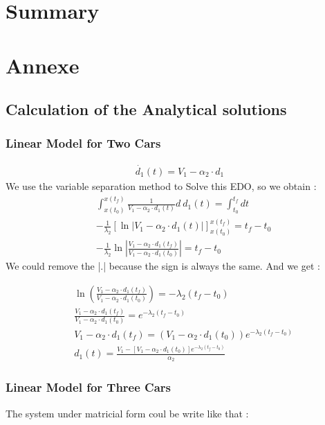 \documentclass{article}
\begin{document}
	\section{Summary}
	
	\section{Annexe}
	
	\subsection{Calculation of the Analytical solutions}
	
	\subsubsection{Linear Model for Two Cars}
	
	\label{eq:EDO1}
	\begin{align*} 
		\dot{d_1}(t) = V_1 - \alpha_2 \cdot d_1
	\end{align*}
	We use the variable separation method to Solve this EDO, so we obtain : 
	\begin{align*} 
		&\int_{x(t_0)}^{x(t_f)} \frac{1}{V_1 - \alpha_2 \cdot d_1(t)} d \ d_1(t) = \int_{t_0}^{t_f} dt \\
		&-\frac{1}{\lambda_2} \left[ \ln\left| V_1 - \alpha_2 \cdot d_1(t) \right| \right]_{x(t_0)}^{x(t_f)} = t_f-t_0 \\
		&-\frac{1}{\lambda_2} \ln\left| \frac{V_1 - \alpha_2 \cdot d_1(t_f)}{V_1 - \alpha_2 \cdot d_1(t_0)} \right| = t_f-t_0
	\end{align*}
	We could remove the |.| because the sign is always the same. And we get : 
	
	\begin{align*}
		&\ln\left( \frac{V_1 - \alpha_2 \cdot d_1(t_f)}{V_1 - \alpha_2 \cdot d_1(t_0)} \right)  = -\lambda_2( t_f-t_0)\\
		&\frac{V_1 - \alpha_2 \cdot d_1(t_f)}{V_1 - \alpha_2 \cdot d_1(t_0)}  = e^{-\lambda_2( t_f-t_0)} \\
		&V_1 - \alpha_2 \cdot d_1(t_f)   = (V_1 - \alpha_2 \cdot d_1(t_0))e^{-\lambda_2( t_f-t_0)} \\
		&\boxed{
			d_1(t) = \frac{V_1 - [V_1 - \alpha_2 \cdot d_1(t_0)]e^{-\lambda_2( t_f-t_0)}}{\alpha_2}
		}
	\end{align*}

	\subsubsection{Linear Model for Three Cars}
	\label{eq:EDO2}
	The system under matricial form coul be write like that :
	
\end{document}
